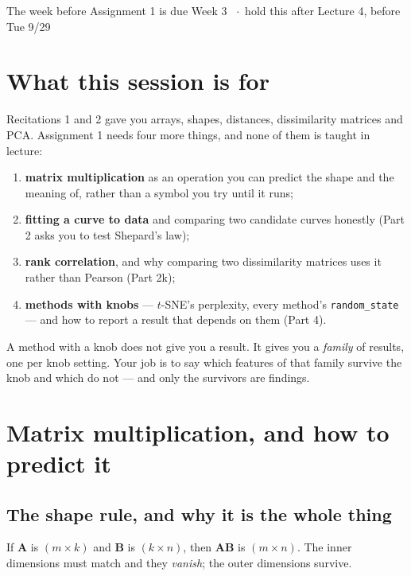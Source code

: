 \documentclass[11pt]{article}
\begin{document}
  {The week before Assignment 1 is due}
  {Week 3 \ $\cdot$\ hold this after Lecture 4, before Tue 9/29}

\section*{What this session is for}

Recitations 1 and 2 gave you arrays, shapes, distances, dissimilarity matrices
and PCA. Assignment 1 needs four more things, and none of them is taught in
lecture:

\begin{enumerate}
  \item \textbf{matrix multiplication} as an operation you can predict the shape
        and the meaning of, rather than a symbol you try until it runs;
  \item \textbf{fitting a curve to data} and comparing two candidate curves
        honestly (Part 2 asks you to test Shepard's law);
  \item \textbf{rank correlation}, and why comparing two dissimilarity matrices
        uses it rather than Pearson (Part 2k);
  \item \textbf{methods with knobs} --- $t$-SNE's perplexity, every method's
        \texttt{random\_state} --- and how to report a result that depends on
        them (Part 4).
\end{enumerate}

\begin{keybox}
 A method with a knob does not give you a result. It
gives you a \emph{family} of results, one per knob setting. Your job is to say
which features of that family survive the knob and which do not --- and only the
survivors are findings.
\end{keybox}

\section{Matrix multiplication, and how to predict it}

\subsection{The shape rule, and why it is the whole thing}

If $\boldsymbol{A}$ is $(m \times k)$ and $\boldsymbol{B}$ is $(k \times n)$,
then $\boldsymbol{A}\boldsymbol{B}$ is $(m \times n)$. The inner dimensions must
match and they \emph{vanish}; the outer dimensions survive.
\end{document}
